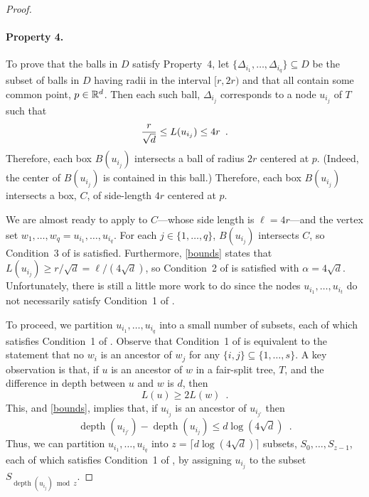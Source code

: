 \documentclass{patmorin}
\DeclareMathOperator{\depth}{depth}
\begin{document}
\begin{proof}
  \paragraph{Property 4.}
  To prove that the balls in $D$ satisfy Property~4, let
  $\{\Delta_{i_1},\ldots,\Delta_{i_q}\}\subseteq D$ be the subset of
  balls in $D$ having radii in the interval $[r,2r)$ and that all contain
  some common point, $p\in\mathbb{R}^d$.   Then each such ball, $\Delta_{i_j}$
  corresponds to a node $u_{i_j}$ of $T$ such that
  \begin{equation}
        \frac{r}{\sqrt{d}} \le L(u_{i_j}) \le 4r \enspace . \eqlabel{bounds}
  \end{equation}
  Therefore, each box $B(u_{i_j})$ intersects a ball of radius $2r$
  centered at $p$.  (Indeed, the center of $B(u_{i_j})$ is contained in
  this ball.)  Therefore, each box $B(u_{i_j})$ intersects a box, $C$, of
  side-length $4r$ centered at $p$.  

  We are almost ready to apply  to
  $C$---whose side length is $\ell = 4r$---and the vertex set
  $w_1,\ldots,w_q=u_{i_1},\ldots,u_{i_q}$. For each $j\in\{1,\ldots,q\}$,
  $B(u_{i_j})$ intersects $C$, so Condition~3 of 
  is satisfied.  Furthermore, \eqref{bounds} states that $L(u_{i_j})\ge
  r/\sqrt{d} = \ell/(4\sqrt{d})$, so Condition~2 of 
  is satisfied with $\alpha=4\sqrt{d}$.  Unfortunately, there is still
  a little more work to do since the nodes $u_{i_1},\ldots,u_{i_t}$
  do not necessarily satisfy Condition~1 of .

  To proceed, we partition $u_{i_1},\ldots,u_{i_q}$ into a small number of
  subsets, each of which satisfies Condition~1 of .
  Observe that Condition~1 of  is equivalent
  to the statement that no $w_i$ is an ancestor of $w_j$ for any
  $\{i,j\}\subseteq\{1,\ldots,s\}$.  A key observation is that, if $u$
  is an ancestor of $w$ in a fair-split tree, $T$, and the difference
  in depth between $u$ and $w$ is $d$, then
  \[
      L(u) \ge 2L(w) \enspace .
  \]
  This, and \eqref{bounds}, implies that, if $u_{i_j}$ is an ancestor
  of $u_{i_{j'}}$ then
  \[
     \depth(u_{i_{j'}})-\depth(u_{i_{j}}) \le d\log(4\sqrt{d}) \enspace .
  \]
  Thus, we can partition $u_{i_1},\ldots,u_{i_q}$ into $z=\lceil
  d\log(4\sqrt{d})\rceil$ subsets, $S_0,\ldots,S_{z-1}$, each of which
  satisfies Condition~1 of , by assigning $u_{i_j}$
  to the subset $S_{\depth(u_{i_j})\bmod z}$.  


\end{proof}
\end{document}
